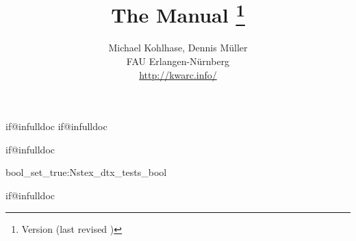 \makeatletter
\ifcsname if@infulldoc\endcsname\else
    \expandafter\newif\csname if@infulldoc\endcsname\@infulldocfalse
\fi
\makeatother

\csname if@infulldoc\endcsname\else



\csname bool_set_true:N\expandafter\endcsname\csname stex_dtx_tests_bool\endcsname


  \csname if@infulldoc\endcsname\else
	\title{
		The {} Manual
		\thanks{Version {\fileversion} (last revised {\filedate})}
 	}
	\author{Michael Kohlhase, Dennis Müller\\
		FAU Erlangen-Nürnberg\\
		\url{http://kwarc.info/}
	}
	\maketitle
	
	
	
